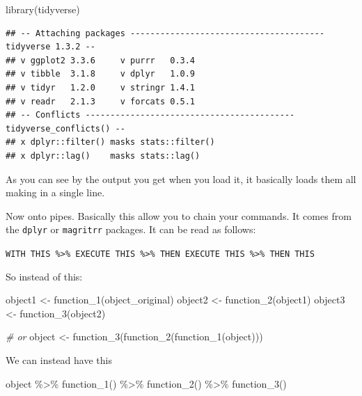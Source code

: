 \documentclass[
]{book}
\newenvironment{Shaded}{\begin{snugshade}}{\end{snugshade}}
\newcommand{\CommentTok}[1]{\textcolor[rgb]{0.56,0.35,0.01}{\textit{#1}}}
\newcommand{\FunctionTok}[1]{\textcolor[rgb]{0.00,0.00,0.00}{#1}}
\newcommand{\NormalTok}[1]{#1}
\newcommand{\OtherTok}[1]{\textcolor[rgb]{0.56,0.35,0.01}{#1}}
\newcommand{\SpecialCharTok}[1]{\textcolor[rgb]{0.00,0.00,0.00}{#1}}
\begin{document}
\begin{Shaded}
\begin{Highlighting}[]
\FunctionTok{library}\NormalTok{(tidyverse)}
\end{Highlighting}
\end{Shaded}

\begin{verbatim}
## -- Attaching packages --------------------------------------- tidyverse 1.3.2 --
## v ggplot2 3.3.6     v purrr   0.3.4
## v tibble  3.1.8     v dplyr   1.0.9
## v tidyr   1.2.0     v stringr 1.4.1
## v readr   2.1.3     v forcats 0.5.1
## -- Conflicts ------------------------------------------ tidyverse_conflicts() --
## x dplyr::filter() masks stats::filter()
## x dplyr::lag()    masks stats::lag()
\end{verbatim}

As you can see by the output you get when you load it, it basically loads them all making in a single line.

Now onto pipes.
Basically this allow you to chain your commands.
It comes from the \texttt{dplyr} or \texttt{magritrr} packages.
It can be read as follows:

\texttt{WITH\ THIS\ \%\textgreater{}\%\ EXECUTE\ THIS\ \%\textgreater{}\%\ THEN\ EXECUTE\ THIS\ \%\textgreater{}\%\ THEN\ THIS}

So instead of this:

\begin{Shaded}
\begin{Highlighting}[]
\NormalTok{object1 }\OtherTok{\textless{}{-}} \FunctionTok{function\_1}\NormalTok{(object\_original)}
\NormalTok{object2 }\OtherTok{\textless{}{-}} \FunctionTok{function\_2}\NormalTok{(object1)}
\NormalTok{object3 }\OtherTok{\textless{}{-}} \FunctionTok{function\_3}\NormalTok{(object2)}

\CommentTok{\# or}
\NormalTok{object }\OtherTok{\textless{}{-}} \FunctionTok{function\_3}\NormalTok{(}\FunctionTok{function\_2}\NormalTok{(}\FunctionTok{function\_1}\NormalTok{(object)))}
\end{Highlighting}
\end{Shaded}

We can instead have this

\begin{Shaded}
\begin{Highlighting}[]
\NormalTok{object }\SpecialCharTok{\%\textgreater{}\%} 
  \FunctionTok{function\_1}\NormalTok{() }\SpecialCharTok{\%\textgreater{}\%} 
  \FunctionTok{function\_2}\NormalTok{() }\SpecialCharTok{\%\textgreater{}\%} 
  \FunctionTok{function\_3}\NormalTok{()}
\end{Highlighting}
\end{Shaded}
\end{document}
